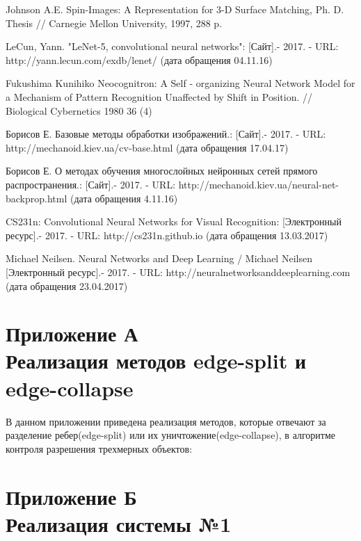 \documentclass[14pt]{article}
\numberwithin{figure}{section}
\numberwithin{equation}{section}
\begin{document}
\begin{thebibliography}{9}
	Johnson A.E. Spin-Images: A Representation for 3-D Surface Matching, Ph. D. Thesis // Carnegie Mellon University, 1997, 288 p.

	LeCun, Yann. "LeNet-5, convolutional neural networks": [Сайт].- 2017. - URL: http://yann.lecun.com/exdb/lenet/ (дата обращения 04.11.16)

	Fukushima Kunihiko Neocognitron: A Self - organizing Neural Network Model for a Mechanism of Pattern Recognition Unaffected by Shift in Position. // Biological Cybernetics 1980 36 (4)

	Борисов Е. Базовые методы обработки изображений.: [Сайт].- 2017. - URL: http://mechanoid.kiev.ua/cv-base.html (дата обращения 17.04.17)

	Борисов Е. О методах обучения многослойных нейронных сетей прямого распространения.: [Сайт].- 2017. - URL: http://mechanoid.kiev.ua/neural-net-backprop.html (дата обращения 4.11.16)

	CS231n: Convolutional Neural Networks for Visual Recognition: [Электронный ресурс].- 2017. - URL: http://cs231n.github.io (дата обращения 13.03.2017)

    Michael Neilsen. Neural Networks and Deep Learning / Michael Neilsen [Электронный ресурс].- 2017. - URL: http://neuralnetworksanddeeplearning.com (дата обращения 23.04.2017)



\end{thebibliography}

\newpage
{}
\section*{Приложение А\\Реализация методов edge-split и edge-collapse}\label{attachA}

В данном приложении приведена реализация методов, которые отвечают за разделение ребер(edge-split) или их уничтожение(edge-collapse), в алгоритме контроля разрешения трехмерных объектов:



\newpage
{}
\section*{Приложение Б\\Реализация системы №1}
\end{document}
